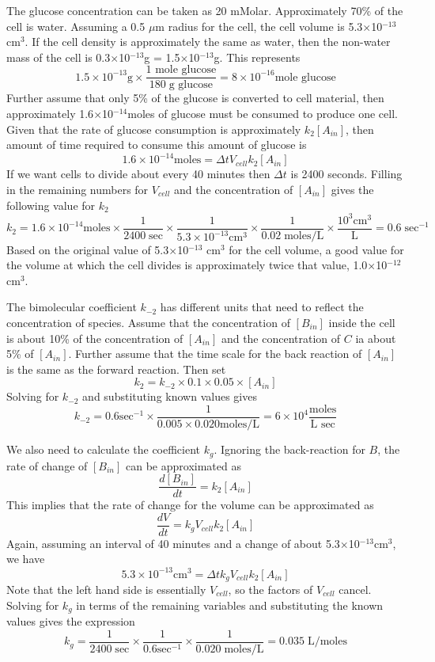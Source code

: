 \documentclass[12pt]{article}
\begin{document}
The glucose concentration can be taken as 20 mMolar. Approximately 70\% of the cell is
water. Assuming a 0.5 $\mu$m radius for the cell, the cell volume is 5.3$\times$10$^{-13}$
cm$^3$. If the cell density is approximately the same as water, then the non-water mass of
the cell is 0.3$\times$10$^{-13}$g = 1.5$\times$10$^{-13}$g. This represents
\[
1.5\times 10^{-13}\mbox{g}\times\frac{\mbox{1 mole glucose}}{180\;\mbox{g glucose}} = 8\times 10^{-16}
\mbox{mole glucose}
\]
Further assume that only 5\% of the glucose is converted to cell material, then approximately
1.6$\times$10$^{-14}$moles of glucose must be consumed to produce one cell. Given that the rate of
glucose consumption is approximately $k_2 [A_{in}]$, then amount of time required to consume this
amount of glucose is
\[
1.6\times 10^{-14}\mbox{moles} = \Delta t V_{cell}k_2 [A_{in}]
\]
If we want cells to divide about every 40 minutes then $\Delta t$ is 2400 seconds. Filling in the
remaining numbers for $V_{cell}$ and the concentration of $[A_{in}]$ gives the following value for $k_2$
\[
k_2 = 1.6\times 10^{-14}\mbox{moles}\times\frac{1}{2400\;\mbox{sec}}
\times\frac{1}{5.3\times 10^{-13}\mbox{cm}^3}
\times\frac{1}{0.02\;\mbox{moles/L}}\times\frac{10^3\mbox{cm}^3}{\mbox{L}}= 0.6\;\mbox{sec}^{-1}
\]
Based on the original value of 5.3$\times$10$^{-13}$ cm$^3$ for the cell volume, a good value for the volume
at which the cell divides is approximately twice that value, 1.0$\times$10$^{-12}$ cm$^3$.

The bimolecular coefficient $k_{-2}$ has different units that need to reflect the concentration
of species. Assume that the concentration of $[B_{in}]$ inside the cell is about 10\% of the concentration
of $[A_{in}]$ and the concentration of $C$ ia about 5\% of $[A_{in}]$. Further assume that the time scale for the
back reaction of $[A_{in}]$ is the same as the forward reaction. Then set
\[
k_2 = k_{-2}\times 0.1\times 0.05\times [A_{in}]
\]
Solving for $k_{-2}$ and substituting known values gives
\[
k_{-2} = 0.6\mbox{sec}^{-1}\times\frac{1}{ 0.005\times 0.020 \mbox{moles/L}}=6\times 10^4
\frac{\mbox{moles}}{\mbox{L sec}}
\]

We also need to calculate the coefficient $k_g$.
Ignoring the back-reaction for $B$, the rate of change of $[B_{in}]$ can be approximated as
\[
\frac{d[B_{in}]}{dt} = k_2 [A_{in}]
\]
This implies that the rate of change for the volume can be approximated as
\[
\frac{dV}{dt} = k_g V_{cell}k_2 [A_{in}]
\]
Again, assuming an interval of 40 minutes and a change of about 5.3$\times$10$^{-13}$cm$^3$, we have
\[
5.3\times 10^{-13}\mbox{cm}^3 = \Delta t k_g V_{cell}k_2 [A_{in}]
\]
Note that the left hand side is essentially $V_{cell}$, so the factors of $V_{cell}$ cancel.
Solving for $k_g$ in terms of the remaining variables and substituting the known values gives
the expression
\[
k_g = \frac{1}{2400\;\mbox{sec}} \times\frac{1}{0.6\mbox{sec}^{-1}}\times\frac{1}{0.020\;\mbox{moles/L}}
=0.035\;\mbox{L/moles}
\]
\end{document}
